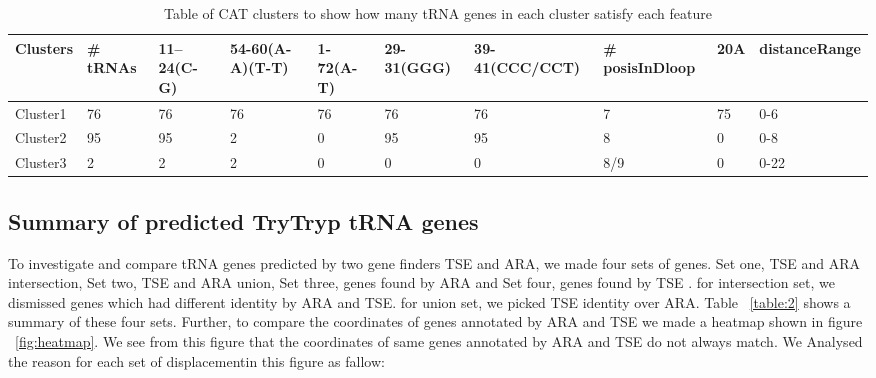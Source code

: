 \documentclass[
10pt, %
a4paper, %
oneside, %
headinclude,footinclude, %
BCOR5mm, %
]{scrartcl}
\begin{document}
\begin{table}[hbt]
\caption{Table of CAT clusters to show how many tRNA genes in each cluster satisfy each feature}
\begin{adjustbox}{width=\columnwidth,center}
\begin{tabular}{|l|lllllllll|}
\hline
Clusters & \# tRNAs & 11–24(C-G) & 54-60(A-A)(T-T) & 1-72(A-T) & 29-31(GGG) & 39-41(CCC/CCT) & \#  posisInDloop & 20A & distanceRange \\
\hline
Cluster1 & 76 & 76 & 76 & 76 & 76 & 76 & 7 & 75 & 0-6\\
Cluster2 & 95 & 95 & 2 & 0 & 95 & 95 & 8 & 0 & 0-8\\
Cluster3 & 2 & 2 & 2 & 0 & 0 & 0 & 8/9 & 0 & 0-22\\
\hline
\end{tabular}
\label{table:1}
\end{adjustbox}
\end{table}




\subsection{\textbf{Summary of predicted TryTryp tRNA genes}}

To investigate and compare tRNA genes predicted by two gene finders TSE and ARA, we made four sets of genes. Set one, TSE and ARA intersection, Set two, TSE and ARA union, Set three, genes found by ARA and Set four, genes found by TSE . for intersection set, we dismissed genes which had different identity by ARA and TSE. for union set, we picked TSE identity over ARA. Table  ~\ref{table:2} shows a summary of these four sets. Further, to compare the coordinates of genes annotated by ARA and TSE we made a heatmap shown in figure ~\ref{fig:heatmap}. We see from this figure that the coordinates of same genes annotated by ARA and TSE do not always match. We Analysed the reason for each set of displacementin this figure as fallow:
\end{document}
